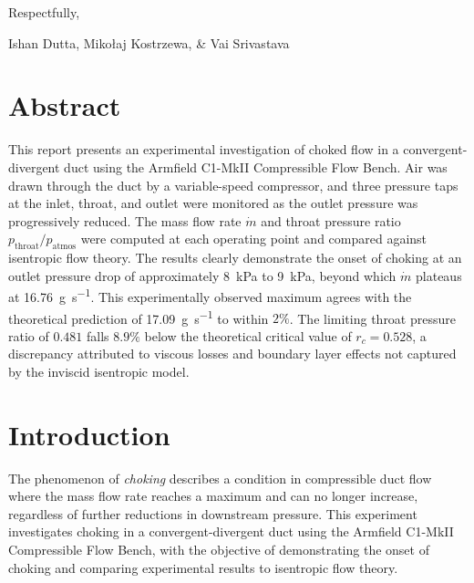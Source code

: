 Respectfully,

Ishan Dutta, Mikołaj Kostrzewa, \& Vai Srivastava


\pagebreak

\thispagestyle{empty}
\hypertarget{tableofcontents}{\tableofcontents}

\renewcommand{\listfigurename}{Figures}
\listoffigures

\renewcommand{\listtablename}{Tables}
\listoftables

\renewcommand{\listlistingname}{Listings}
\listoflistings

\newpage
{}


\section{Abstract} \label{sec:abstract}

This report presents an experimental investigation of choked flow in a convergent-divergent duct using the Armfield C1-MkII Compressible Flow Bench. Air was drawn through the duct by a variable-speed compressor, and three pressure taps at the inlet, throat, and outlet were monitored as the outlet pressure was progressively reduced. The mass flow rate \( \dot{m} \) and throat pressure ratio \( p_\text{throat}/p_\text{atmos} \) were computed at each operating point and compared against isentropic flow theory. The results clearly demonstrate the onset of choking at an outlet pressure drop of approximately \qty{8}{\kPa} to \qty{9}{\kPa}, beyond which \( \dot{m} \) plateaus at \qty{16.76}{\g\per\s}. This experimentally observed maximum agrees with the theoretical prediction of \qty{17.09}{\g\per\s} to within \( 2\% \). The limiting throat pressure ratio of \( 0.481 \) falls \( 8.9\% \) below the theoretical critical value of \( r_c = 0.528 \), a discrepancy attributed to viscous losses and boundary layer effects not captured by the inviscid isentropic model.

\section{Introduction} \label{sec:introduction}

The phenomenon of \textit{choking} describes a condition in compressible duct flow where the mass flow rate reaches a maximum and can no longer increase, regardless of further reductions in downstream pressure. This experiment investigates choking in a convergent-divergent duct using the Armfield C1-MkII Compressible Flow Bench, with the objective of demonstrating the onset of choking and comparing experimental results to isentropic flow theory.

